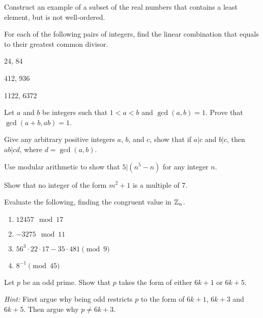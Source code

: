 \documentclass[12pt]{article}
\begin{document}
\begin{qu}
Construct an example of a subset of the real numbers that contains a least element, but is not well-ordered.
\end{qu}

\begin{qu} For each of the following pairs of integers, find the linear combination that equals to their greatest common divisor.

\begin{inparaenum}[a)]
\item 24, 84
\tab \item 412, 936
\tab \item 1122, 6372
\end{inparaenum}
\end{qu}

\begin{qu} Let $a$ and $b$ be integers such that $1<a<b$ and $\gcd(a,b)=1$. Prove that $\gcd(a+b,ab)=1$. \end{qu}

\begin{qu} Give any arbitrary positive integers $a$, $b$, and $c$, show that if $a|c$ and $b|c$, then $ab|cd$, where $d=\gcd(a,b)$. \end{qu}

\begin{qu} Use modular arithmetic to show that $5|(n^5 -n)$ for any integer $n$. \end{qu}

\begin{qu} Show that no integer of the form $m^2+1$ is a multiple of $7$. \end{qu}

\begin{qu} Evaluate the following, finding the congruent value in $\mathbb Z_n$. 
\begin{enumerate}[label=\alph*)]
\item $12457 \mod 17$
\item $-3275 \mod 11$
\item $56^3 \cdot 22 \cdot 17-35\cdot 481 \pmod{9}$
\item $8^{-1} \pmod{45}$
\end{enumerate}
\end{qu}

\begin{qu}
Let $p$ be an odd prime. Show that $p$ takes the form of either $6k+1$ or $6k+5$. 

\emph{Hint:} First argue why being odd restricts $p$ to the form of $6k+1$, $6k+3$ and $6k+5$. Then argue why $p\ne 6k+3$. 
\end{qu}
\end{document}
